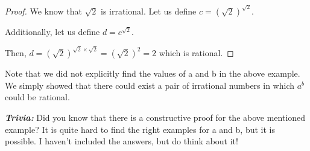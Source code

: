 \begin{proof}
    We know that $\sqrt 2$ is irrational. Let us define $c = (\sqrt 2)^{\sqrt
    2}$.

    Additionally, let us define $d = c ^{\sqrt2}$.

    Then, $d = (\sqrt 2) ^{\sqrt 2 \times \sqrt 2} = (\sqrt 2) ^{2} = 2$ which
    is rational.
\end{proof}

Note that we did not explicitly find the values of a and b in the above
example. We simply showed that there could exist a pair of irrational numbers
in which $a^{b}$ could be rational.

\textbf{\emph{Trivia: }} Did you know that there is a constructive
proof for the above mentioned example? It is quite hard to find the right
examples for a and b, but it is possible. I haven't included the answers, but
do think about it!
